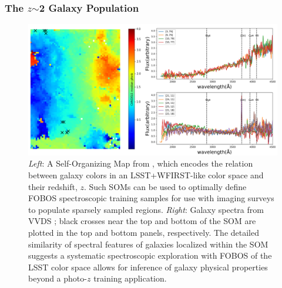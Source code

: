 

\subsubsection{The $z$$\sim$2 Galaxy Population}

\begin{figure}[h!]
\vskip -0.1in
\includegraphics[width=\textwidth]{figs/Hemmati18_Fig8_VVDS_spec.png}
\caption{\small {\it Left}: A Self-Organizing Map
\citep[SOM;][]{1990Natur.346...24K} from \citet{hemmati18}, which
encodes the relation between galaxy colors in an LSST+WFIRST-like
color space and their redshift, $z$. Such SOMs can be used to
optimally define FOBOS spectroscopic training samples for use with
imaging surveys to populate sparsely sampled regions. {\it Right}:
Galaxy spectra from VVDS \citep{2005A&A...439..845L}; black crosses
near the top and bottom of the SOM are plotted in the top and bottom
panels, respectively. The detailed similarity of spectral features of
galaxies localized within the SOM suggests a systematic spectroscopic
exploration with FOBOS of the LSST color space allows for inference
of galaxy physical properties beyond a photo-$z$ training
application.}
\label{fig:SOM}
\end{figure}



